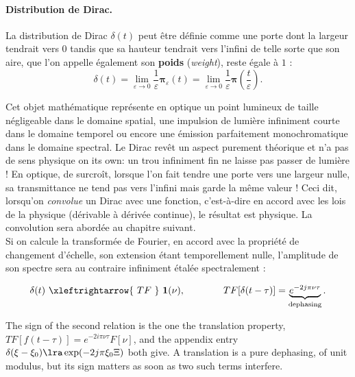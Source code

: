 \paragraph{Distribution de Dirac.}

\begin{definition}
  La distribution de Dirac $\delta(t)$ peut être définie comme une porte dont la
  largeur tendrait vers 0 tandis que sa hauteur tendrait vers l'infini de telle
  sorte que son aire, que l'on appelle également son \textbf{poids}
  (\textit{weight}), reste égale à $1$ :
  \[
    \delta(t)=\lim_{\varepsilon\to 0}\frac{1}{\varepsilon}\boldsymbol{\pi}_\varepsilon(t)
             =\lim_{\varepsilon\to 0}\frac{1}{\varepsilon}\boldsymbol{\pi}\!\left(\frac{t}{\varepsilon}\right).
  \]
\end{definition}

Cet objet mathématique représente en optique un point lumineux de taille
négligeable dans le domaine spatial, une impulsion de lumière infiniment courte
dans le domaine temporel ou encore une émission parfaitement monochromatique dans
le domaine spectral. Le Dirac revêt un aspect purement théorique et n'a pas de
sens physique on its own: un trou infiniment fin ne laisse pas passer de
lumière ! En optique, de surcroît, lorsque l'on fait tendre une porte vers une
largeur nulle, sa transmittance ne tend pas vers l'infini mais garde la même
valeur ! Ceci dit, lorsqu'on \emph{convolue} un Dirac avec une fonction,
c'est-à-dire en accord avec les lois de la physique (dérivable à dérivée
continue), le résultat est physique. La convolution sera abordée au chapitre
suivant.\\

Si on calcule la transformée de Fourier, en accord avec la propriété de
changement d'échelle, son extension étant temporellement nulle, l'amplitude de
son spectre sera au contraire infiniment étalée spectralement :

\[
  \delta(t)\ \xleftrightarrow{\ TF\ }\ \mathbf{1}(\nu),
  \qquad\qquad
  TF[\delta(t-\tau)]=\underbrace{e^{-2j\pi\nu\tau}}_{\text{dephasing}} .
\]

\begin{remark}
  The sign of the second relation is the one the translation property,
  $TF[f(t-\tau)]=e^{-2i\pi\nu\tau}F[\nu]$, and the appendix entry
  $\delta(\xi-\xi_0)\lra\exp(-2j\pi\xi_0\Xi)$ both give. A translation is a
  pure dephasing, of unit modulus, but its sign matters as soon as two such terms
  interfere.
\end{remark}

